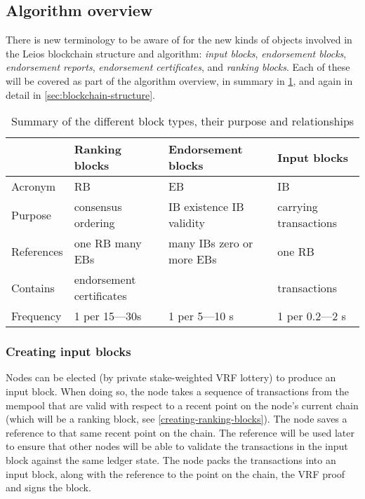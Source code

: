 \documentclass[11pt,a4paper]{article}
\begin{document}
\subsection{Algorithm overview}
\label{sec:algorithm-overview}

There is new terminology to be aware of for the new kinds of objects involved
in the Leios blockchain structure and algorithm: \emph{input blocks},
\emph{endorsement blocks}, \emph{endorsement reports},
\emph{endorsement certificates}, and \emph{ranking blocks}. Each of these will
be covered as part of the algorithm overview, in summary in
\cref{table:block-types}, and again in detail in \cref{sec:blockchain-structure}.

\begin{table}
\begin{center}
\begin{tabular}{l p{3.5cm} p{3.5cm} p{3.5cm}}
\toprule
 & Ranking blocks & Endorsement blocks & Input blocks \\
\midrule
Acronym     & RB              & EB              & IB \\
Purpose     & consensus \newline ordering & IB existence \newline IB validity & carrying transactions \\
References  & one RB \newline many EBs & many IBs \newline zero or more EBs & one RB \\
Contains    & endorsement certificates &                 & transactions \\
Frequency   & 1 per 15---30s & 1 per 5---10 s & 1 per 0.2---2 s \\
\bottomrule
\end{tabular}
\end{center}
\caption{Summary of the different block types, their purpose and relationships}
\label{table:block-types}
\end{table}

\subsubsection{Creating input blocks}
Nodes can be elected (by private stake-weighted VRF lottery) to produce an
input block. When doing so, the node takes a sequence of transactions from the
mempool that are valid with respect to a recent point on the node's current
chain (which will be a ranking block, see \cref{creating-ranking-blocks}).
The node saves a reference to that same recent point on the chain. The
reference will be used later to ensure that other nodes will be able to
validate the transactions in the input block against the same ledger state.
The node packs the transactions into an input block, along with the reference
to the point on the chain, the VRF proof and signs the block.
\end{document}
